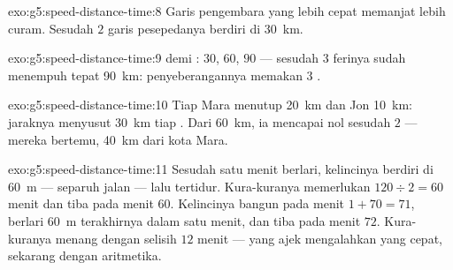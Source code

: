 \begin{solution}{exo:g5:speed-distance-time:8}
Garis pengembara yang lebih cepat memanjat lebih curam. Sesudah $2$
 garis pesepedanya berdiri di \qty{30}{km}.
\end{solution}

\begin{solution}{exo:g5:speed-distance-time:9}
 demi : $30$, $60$, $90$ --- sesudah $3$  ferinya sudah
menempuh tepat \qty{90}{km}: penyeberangannya memakan $3$ .
\end{solution}

\begin{solution}{exo:g5:speed-distance-time:10}
Tiap  Mara menutup \qty{20}{km} dan Jon \qty{10}{km}: jaraknya
menyusut \qty{30}{km} tiap . Dari \qty{60}{km}, ia mencapai nol
sesudah $2$  --- mereka bertemu, \qty{40}{km} dari kota Mara.
\end{solution}

\begin{solution}{exo:g5:speed-distance-time:11}
Sesudah satu menit berlari, kelincinya berdiri di \qty{60}{m} ---
separuh jalan --- lalu tertidur. Kura-kuranya memerlukan
$120 \div 2 = 60$ menit dan tiba pada menit $60$. Kelincinya bangun
pada menit $1 + 70 =
71$, berlari \qty{60}{m} terakhirnya dalam satu menit, dan tiba pada
menit $72$. Kura-kuranya menang dengan selisih $12$ menit --- yang
ajek mengalahkan yang cepat, sekarang dengan aritmetika.
\end{solution}
